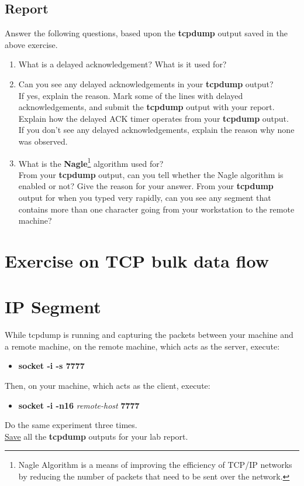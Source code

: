 \documentclass[10pt,a4paper]{article}
\numberwithin{equation}{section}
\numberwithin{figure}{section}
\numberwithin{table}{section}
\begin{document}
    \subsection*{Report}
    Answer the following questions, based upon the \textbf{tcpdump} output saved in the above exercise.
    \begin{enumerate}
        \item What is a delayed acknowledgement?
        What is it used for?
        \item Can you see any delayed acknowledgements in your \textbf{tcpdump} output? \\
        If yes, explain the reason.
        Mark some of the lines with delayed acknowledgements, and submit the \textbf{tcpdump} output with your report. \\
        Explain how the delayed ACK timer operates from your \textbf{tcpdump} output. \\
        If you don’t see any delayed acknowledgements, explain the reason why none was observed.
        \item What is the \textbf{Nagle}\footnote{Nagle Algorithm is a means of improving the efficiency of TCP/IP networks by reducing the number of packets that need to be sent over the network.} algorithm used for? \\
        From your \textbf{tcpdump} output, can you tell whether the Nagle algorithm is enabled or not?
        Give the reason for your answer.
        From your \textbf{tcpdump} output for when you typed very rapidly, can you see any segment that contains more than one character going from your workstation to the remote machine?
    \end{enumerate}

\section*{Exercise on TCP bulk data flow}
\section{IP Segment}
    While tcpdump is running and capturing the packets between your machine and a remote machine, on the remote machine, which acts as the server, execute:
    \begin{itemize}
        \item \textbf{socket -i -s 7777}
    \end{itemize}
    Then, on your machine, which acts as the client, execute:
    \begin{itemize}
        \item \textbf{socket -i -n16} \textit{remote-host} \textbf{7777}
    \end{itemize}
    Do the same experiment three times. \\
    \underline{Save} all the \textbf{tcpdump} outputs for your lab report.
\end{document}
